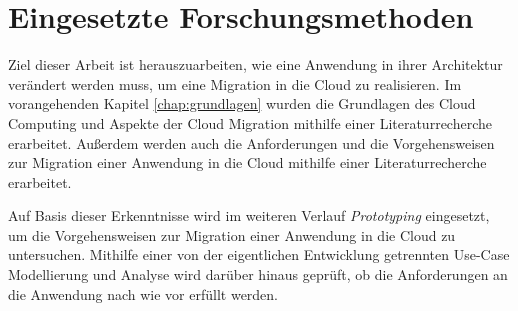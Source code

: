\chapter{Eingesetzte Forschungsmethoden}
Ziel dieser Arbeit ist herauszuarbeiten, wie eine Anwendung in ihrer Architektur verändert werden muss, um eine Migration in die Cloud zu realisieren. Im vorangehenden Kapitel \ref{chap:grundlagen} wurden die Grundlagen des Cloud Computing und Aspekte der Cloud Migration mithilfe einer Literaturrecherche erarbeitet. Außerdem werden auch die Anforderungen und die Vorgehensweisen zur Migration einer Anwendung in die Cloud mithilfe einer Literaturrecherche erarbeitet.

Auf Basis dieser Erkenntnisse wird im weiteren Verlauf \textit{Prototyping} eingesetzt, um die Vorgehensweisen zur Migration einer Anwendung in die Cloud zu untersuchen. Mithilfe einer von der eigentlichen Entwicklung getrennten Use-Case Modellierung und Analyse wird darüber hinaus geprüft, ob die Anforderungen an die Anwendung nach wie vor erfüllt werden.


% 

